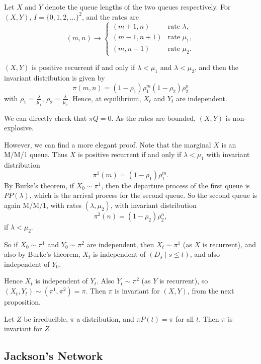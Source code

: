 \documentclass[12pt]{article}
\begin{document}
Let $X$ and $Y$ denote the queue lengths of the two queues respectively. For $(X, Y)$, $I = \{0, 1, 2, \ldots\}^2$, and the rates are
\[
	(m, n) \to
	\begin{cases}
		(m+1,n) & \text{rate } \lambda, \\
		(m-1,n+1) & \text{rate } \mu_1, \\
		(m,n-1) & \text{rate } \mu_2.
	\end{cases}
\]
\begin{theorem}
	$(X, Y)$ is positive recurrent if and only if $\lambda < \mu_1$ and $\lambda < \mu_2$, and then the invariant distribution is given by
	\[
	\pi(m, n) = (1 - \rho_1)\rho_1^{m}(1- \rho_2)\rho_2^{n}
	\]
	with $\rho_1 = \frac{\lambda}{\mu_1}$, $\rho_2 = \frac{\lambda}{\mu_2}$. Hence, at equilibrium, $X_t$ and $Y_t$ are independent.
\end{theorem}


\begin{proofbox}
	We can directly check that $\pi Q = 0$. As the rates are bounded, $(X, Y)$ is non-explosive.

	However, we can find a more elegant proof. Note that the marginal $X$ is an M/M/1 queue. Thus $X$ is positive recurrent if and only if $\lambda < \mu_1$ with invariant distribution
	\[
	\pi^{1}(m) = (1 - \rho_1)\rho_1^{m}.
	\]
	By Burke's theorem, if $X_0 \sim \pi^{1}$, then the departure process of the first queue is $PP(\lambda)$, which is the arrival process for the second queue. So the second queue is again M/M/1, with rates $(\lambda, \mu_2)$, with invariant distribution
	\[
	\pi^{2}(n) = (1 - \rho_2)\rho_2^{n},
	\]
	if $\lambda < \mu_2$.

	So if $X_0 \sim \pi^{1}$ and $Y_0 \sim \pi^{2}$ are independent, then $X_t \sim \pi^{1}$ (as $X$ is recurrent), and also by Burke's theorem, $X_t$ is independent of $(D_s \mid s \leq t)$, and also independent of $Y_0$.

	Hence $X_t$ is independent of $Y_t$. Also $Y_t \sim \pi^{2}$ (as $Y$ is recurrent), so $(X_t, Y_t) \sim (\pi^{1}, \pi^{2}) = \pi$. Then $\pi$ is invariant for $(X, Y)$, from the next proposition.
\end{proofbox}

\begin{proposition}
	Let $Z$ be irreducible, $\pi$ a distribution, and $\pi P(t) = \pi$ for all $t$. Then $\pi$ is invariant for $Z$.
\end{proposition}

\subsection{Jackson's Network}
\label{sub:jacksons_network}
\end{document}
